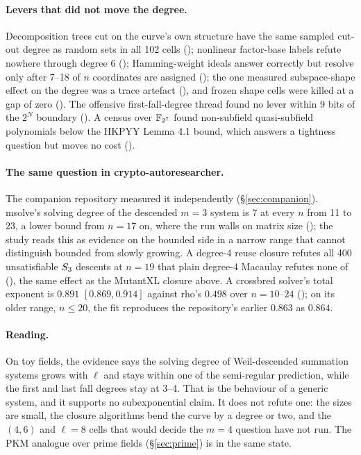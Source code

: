 \paragraph{Levers that did not move the degree.} Decomposition trees cut
on the curve's own structure have the same sampled cut-out degree as random
sets in all 102 cells ();
nonlinear factor-base labels refute nowhere through degree 6
(); Hamming-weight ideals
answer correctly but resolve only after 7--18 of $n$ coordinates are
assigned (); the one measured
subspace-shape effect on the degree was a trace artefact
(),
and frozen shape cells were killed at a gap of zero
(). The offensive first-fall-degree
thread found no lever within 9 bits of the $2^N$ boundary
(). A census
over $\mathbb{F}_{2^7}$ found non-subfield quasi-subfield polynomials below the
HKPYY Lemma 4.1 bound, which answers a tightness question but moves no
cost ().

\paragraph{The same question in crypto-autoresearcher.} The companion
repository measured it independently (\S\ref{sec:companion}). msolve's
solving degree of the descended $m=3$ system is 7 at every $n$ from 11 to 23,
a lower bound from $n=17$ on, where the run walls on matrix size
(); the study reads this as
evidence on the bounded side in a narrow range that cannot distinguish
bounded from slowly growing. A degree-4 reuse closure refutes all 400
unsatisfiable $S_{3}$ descents at $n=19$ that plain degree-4 Macaulay
refutes none of (), the same effect
as the MutantXL closure above. A crossbred solver's total exponent is $0.891$
$[0.869,0.914]$ against rho's $0.498$ over $n=10$--$24$
(); on its older range,
$n\le20$, the fit reproduces the repository's earlier $0.863$ as $0.864$.

\paragraph{Reading.} On toy fields, the evidence says the solving degree of
Weil-descended summation systems grows with $\ell$ and stays within one of
the semi-regular prediction, while the first and last fall degrees stay
at 3--4. That is the behaviour of a generic system, and it supports no
subexponential claim. It does not refute one: the sizes are small, the
closure algorithms bend the curve by a degree or two, and the $(4,6)$ and
$\ell=8$ cells that would decide the $m=4$ question have not run. The PKM
analogue over prime fields (\S\ref{sec:prime}) is in the same state.

